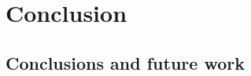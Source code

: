 \documentclass[11pt]{book}
\begin{document}




\part{Conclusion}
\chapter{Conclusions and future work}




% 

\appendix


\end{document}
